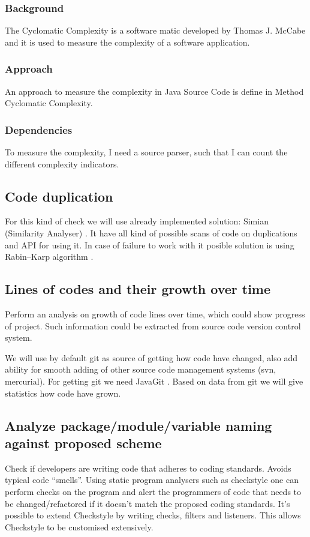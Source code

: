     \subsubsection{Background}
      The Cyclomatic Complexity is a software matic developed by Thomas J. McCabe and it is used to measure the complexity of a software application. 
    \subsubsection{Approach}
      An approach to measure the complexity in Java Source Code is define in Method Cyclomatic Complexity.
    \subsubsection{Dependencies}
      To measure the complexity, I need a source parser, such that I can count the different complexity indicators. 

  \subsection{Code duplication}
    For this kind of check we will use already implemented solution: Simian (Similarity Analyser) \cite{simian1}. It have all kind of possible scans of code on duplications and API \cite{simian2} for using it. In case of failure to work with it posible solution is using Rabin–Karp algorithm \cite{rabinkarp}.

  \subsection{Lines of codes and their growth over time}
    Perform an analysis on growth of code lines over time, which could show progress of project. Such information could be extracted from source code version control system.
    
    We will use by default git as source of getting how code have changed, also add ability for smooth adding of other source code management systems (svn, mercurial). For getting git we need JavaGit \cite{javagit}. Based on data from git we will give statistics how code have grown.

  \subsection{Analyze package/module/variable naming against proposed scheme}
    Check if developers are writing code that adheres to coding standards. Avoids typical code “smells”. Using static program analysers such as checkstyle \cite{checkstyle} one can perform checks on the program and alert the programmers of code that needs to be changed/refactored if it doesn’t match the proposed coding standards. It’s possible to extend Checkstyle by writing checks, filters and listeners. This allows Checkstyle to be customised extensively. 

